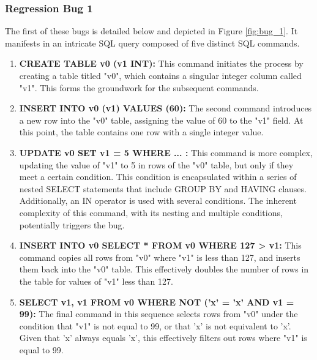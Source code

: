 \documentclass[sigconf]{acmart}
\begin{document}
\subsubsection{Regression Bug 1}

The first of these bugs is detailed below and depicted in Figure \ref{fig:bug_1}. It manifests in an intricate SQL query composed of five distinct SQL commands.

\begin{enumerate}
\item \textbf{CREATE TABLE v0 (v1 INT):} This command initiates the process by creating a table titled "v0", which contains a singular integer column called "v1". This forms the groundwork for the subsequent commands.
\item \textbf{INSERT INTO v0 (v1) VALUES (60):} The second command introduces a new row into the "v0" table, assigning the value of 60 to the "v1" field. At this point, the table contains one row with a single integer value.
\item \textbf{UPDATE v0 SET v1 = 5 WHERE ... :} This command is more complex, updating the value of "v1" to 5 in rows of the "v0" table, but only if they meet a certain condition. This condition is encapsulated within a series of nested SELECT statements that include GROUP BY and HAVING clauses. Additionally, an IN operator is used with several conditions. The inherent complexity of this command, with its nesting and multiple conditions, potentially triggers the bug.
\item \textbf{INSERT INTO v0 SELECT * FROM v0 WHERE 127 > v1:} This command copies all rows from "v0" where "v1" is less than 127, and inserts them back into the "v0" table. This effectively doubles the number of rows in the table for values of "v1" less than 127.
\item \textbf{SELECT v1, v1 FROM v0 WHERE NOT ('x' = 'x' AND v1 = 99):} The final command in this sequence selects rows from "v0" under the condition that "v1" is not equal to 99, or that 'x' is not equivalent to 'x'. Given that 'x' always equals 'x', this effectively filters out rows where "v1" is equal to 99.
\end{enumerate}
\end{document}
